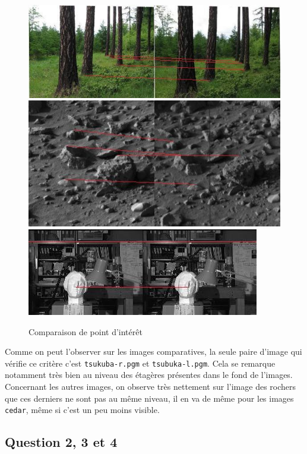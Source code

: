 \documentclass[12pt]{report}
\begin{document}
\begin{figure}
\begin{center}
\includegraphics[scale=0.7]{Images/cedar.jpg} 
\includegraphics[scale=0.8]{Images/rocher.jpg} \\
\includegraphics[scale=1]{Images/tsukuba.jpg} 
\caption{Comparaison de point d'intérêt}
\end{center}
\end{figure}

Comme on peut l'observer sur les images comparatives, la seule paire d'image qui vérifie ce critère c'est \texttt{tsukuba-r.pgm} et \texttt{tsubuka-l.pgm}. Cela se remarque notamment très bien au niveau des étagères présentes dans le fond de l'images. Concernant les autres images, on observe très nettement sur l'image des rochers que ces derniers ne sont pas au même niveau, il en va de même pour les images \texttt{cedar}, même si c'est un peu moins visible.

\subsection*{Question 2, 3 et 4}
\end{document}
